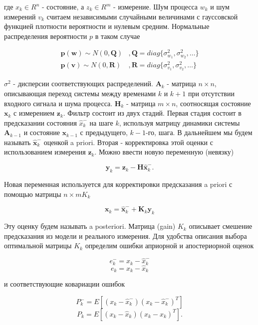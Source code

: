 \documentclass[12pt,a4paper]{article}
\begin{document}
где $x_k \in R^n$ - состояние, а $z_k \in R^m$ - измерение. Шум процесса $w_k$ и шум измерений $v_k$ считаем независимыми случайными величинами с гауссовской функцией плотности вероятности и нулевым средним. Нормальные распределения вероятности $p$ в таком случае

\begin{align*}
	\boldsymbol p(\boldsymbol w) \sim N(0,\boldsymbol Q) &, \boldsymbol Q = diag\{ \sigma^2_{w_1}, \sigma^2_{w_2}, \dots \} \\
	\boldsymbol p(\boldsymbol v) \sim N(0,\boldsymbol R) &, \boldsymbol R = diag\{ \sigma^2_{v_1}, \sigma^2_{v_2}, \dots \}
\end{align*}

$\sigma^2$ - дисперсии соответствующих распределений. $\boldsymbol A_k$ - матрица $n \times n$, описывающая переход системы между временами $k$ и $k+1$ при отсутствии входного сигнала и шума процесса. $\boldsymbol H_k$ - матрица $m \times n$, соотносящая состояние $\boldsymbol x_k$ с измерением $\boldsymbol z_k$. Фильтр состоит из двух стадий. Первая стадия состоит в предсказании состояния $\hat{x}_k^-$ на шаге $k$, используя матрицу динамики системы $\boldsymbol A_{k-1}$ и состояние $\boldsymbol x_{k-1}$ с предыдущего, $k-1$-го, шага. В дальнейшем мы будем называть $\hat{\boldsymbol x}_k^-$ оценкой a priori. Вторая - корректировка этой оценки с использованием измерения $\boldsymbol z_k$. Можно ввести новую переменную (невязку)

$$ \boldsymbol y_k = \boldsymbol z_k - \boldsymbol H\hat{\boldsymbol x}_k^- . $$

Новая переменная используется для корректировки предсказания a priori с помощью матрицы $n \times m K_k$

\begin{equation}
	\label{eq:kalman_correction_state}
	\boldsymbol x_k = \hat{\boldsymbol x}_k^- + \boldsymbol K_k \boldsymbol y_k
\end{equation}

Эту оценку будем называть a posteriori. Матрица (gain) $K_k$ описывает смешение предсказания из модели и реального измерения. Для удобства описания выбора оптимальной матрицы $K_k$ определим ошибки априорной и апостериорной оценок

$$ e_k^- = x_k - \hat{x}_k^- $$
$$ e_k = x_k - \hat{x}_k $$

и соответствующие ковариации ошибок

$$ P_k^- = E[(x_k - \hat{x}_k^-)(x_k - \hat{x}_k^-)^T] $$
$$ P_k = E[(x_k - \hat{x}_k)(x_k - \hat{x}_k)^T] . $$
\end{document}
